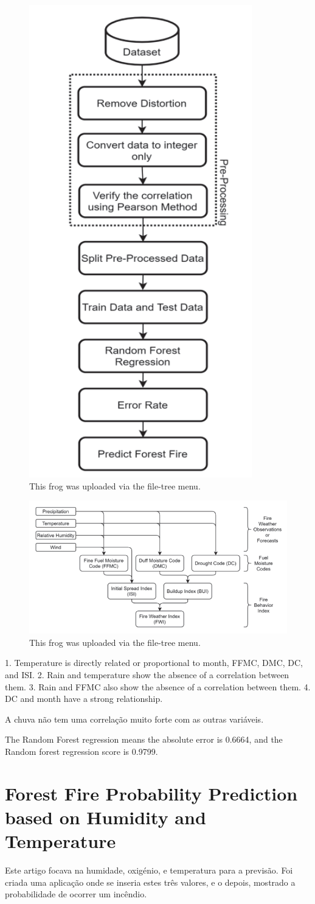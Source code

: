 \documentclass{article}
\begin{document}
\begin{figure}[ht]
 \centering
  \includegraphics[width=0.25\linewidth]{imgs/flow_chart_detect_fire.png}
   \caption{\label{fig:flow_chaft}This frog was uploaded via the file-tree menu.}
\end{figure}

\begin{figure}[ht]
 \centering
  \includegraphics[width=0.70\linewidth]{imgs/fwi_structure.png}
   \caption{\label{fig:fwi_structure}This frog was uploaded via the file-tree menu.}
\end{figure}



1. Temperature is directly related or proportional to 
month, FFMC, DMC, DC, and ISI. 
2. Rain and temperature show the absence of a 
correlation between them. 
3. Rain and FFMC also show the absence of a 
correlation between them. 
4. DC and month have a strong relationship. 

A chuva não tem uma correlação muito forte com as outras variáveis.

The Random Forest regression means the absolute error 
is 0.6664, and the Random forest regression score is 0.9799.



\section{Forest Fire Probability Prediction based on Humidity and Temperature \cite{10085661}}
Este artigo focava na humidade, oxigénio, e temperatura para a previsão. Foi criada uma aplicação onde se inseria estes três valores, e o depois, mostrado a probabilidade de ocorrer um incêndio.   
\end{document}
